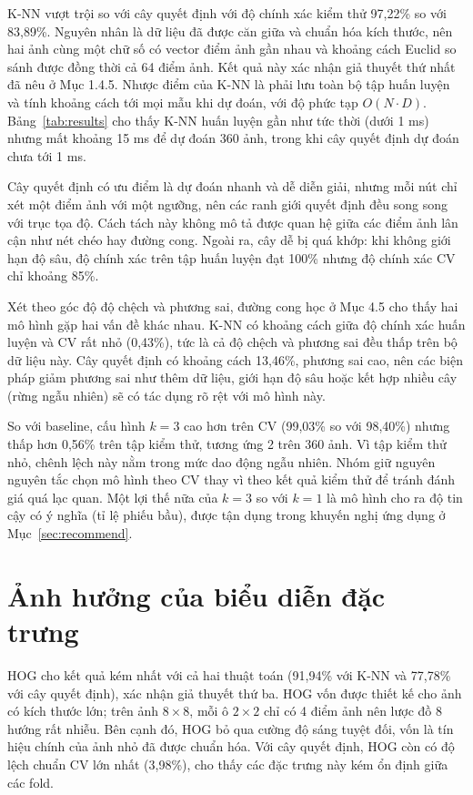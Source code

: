 \documentclass[a4paper,oneside]{report}
\begin{document}
K-NN vượt trội so với cây quyết định với độ chính xác kiểm thử 97,22\% so với 83,89\%. Nguyên nhân là dữ liệu đã
được căn giữa và chuẩn hóa kích thước, nên hai ảnh cùng một chữ số có vector điểm ảnh gần nhau và khoảng cách
Euclid so sánh được đồng thời cả 64 điểm ảnh. Kết quả này xác nhận giả thuyết thứ nhất đã nêu ở Mục 1.4.5. Nhược
điểm của K-NN là phải lưu toàn bộ tập huấn luyện và tính khoảng cách tới mọi mẫu khi dự đoán, với độ phức tạp
$O(N \cdot D)$. Bảng~\ref{tab:results} cho thấy K-NN huấn luyện gần như tức thời (dưới 1 ms) nhưng mất khoảng 15 ms
để dự đoán 360 ảnh, trong khi cây quyết định dự đoán chưa tới 1 ms.

Cây quyết định có ưu điểm là dự đoán nhanh và dễ diễn giải, nhưng mỗi nút chỉ xét một điểm ảnh với một ngưỡng,
nên các ranh giới quyết định đều song song với trục tọa độ. Cách tách này không mô tả được quan hệ giữa các điểm
ảnh lân cận như nét chéo hay đường cong. Ngoài ra, cây dễ bị quá khớp: khi không giới hạn độ sâu, độ chính xác
trên tập huấn luyện đạt 100\% nhưng độ chính xác CV chỉ khoảng 85\%.

Xét theo góc độ độ chệch và phương sai, đường cong học ở Mục 4.5 cho thấy hai mô hình gặp hai vấn đề khác nhau.
K-NN có khoảng cách giữa độ chính xác huấn luyện và CV rất nhỏ (0,43\%), tức là cả độ chệch và phương sai đều thấp
trên bộ dữ liệu này. Cây quyết định có khoảng cách 13,46\%, phương sai cao, nên các biện pháp giảm phương sai như
thêm dữ liệu, giới hạn độ sâu hoặc kết hợp nhiều cây (rừng ngẫu nhiên) sẽ có tác dụng rõ rệt với mô hình này.

So với baseline, cấu hình $k = 3$ cao hơn trên CV (99,03\% so với 98,40\%) nhưng thấp hơn 0,56\% trên tập kiểm
thử, tương ứng 2 trên 360 ảnh. Vì tập kiểm thử nhỏ, chênh lệch này nằm trong mức dao động ngẫu nhiên. Nhóm giữ
nguyên nguyên tắc chọn mô hình theo CV thay vì theo kết quả kiểm thử để tránh đánh giá quá lạc quan. Một lợi thế
nữa của $k = 3$ so với $k = 1$ là mô hình cho ra độ tin cậy có ý nghĩa (tỉ lệ phiếu bầu), được tận dụng trong
khuyến nghị ứng dụng ở Mục~\ref{sec:recommend}.

\section{Ảnh hưởng của biểu diễn đặc trưng}

HOG cho kết quả kém nhất với cả hai thuật toán (91,94\% với K-NN và 77,78\% với cây quyết định), xác nhận giả thuyết
thứ ba. HOG vốn được thiết kế cho ảnh có kích thước lớn; trên ảnh $8 \times 8$, mỗi ô $2 \times 2$ chỉ có 4 điểm ảnh
nên lược đồ 8 hướng rất nhiễu. Bên cạnh đó, HOG bỏ qua cường độ sáng tuyệt đối, vốn là tín hiệu chính của ảnh nhỏ
đã được chuẩn hóa. Với cây quyết định, HOG còn có độ lệch chuẩn CV lớn nhất (3,98\%), cho thấy các đặc trưng này
kém ổn định giữa các fold.
\end{document}
